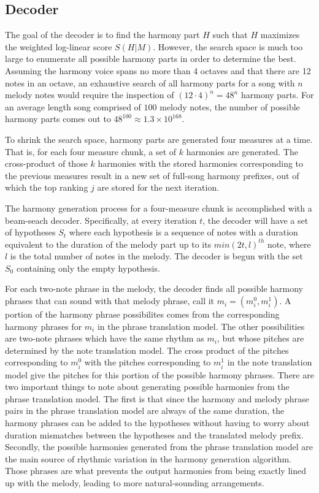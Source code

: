 \documentclass{sig-alternate}
\begin{document}
\subsection {Decoder}
The goal of the decoder is to find the harmony part $H$ such that $H$ maximizes the weighted log-linear score $S(H | M)$. However, the search space is much too large to enumerate all possible harmony parts in order to determine the best. Assuming the harmony voice spans no more than 4 octaves and that there are 12 notes in an octave, an exhaustive search of all harmony parts for a song with $n$ melody notes would require the inspection of $(12\cdot 4)^{n} = 48^{n}$ harmony parts. For an average length song comprised of $100$ melody notes, the number of possible harmony parts comes out to $48^{100} \approx 1.3\times10^{168}$. 

To shrink the search space, harmony parts are generated four measures at a time. That is, for each four measure chunk, a set of $k$ harmonies are generated. The cross-product of those $k$ harmonies with the stored harmonies corresponding to the previous measures result in a new set of full-song harmony prefixes, out of which the top ranking $j$ are stored for the next iteration.

The harmony generation process for a four-measure chunk is accomplished with a beam-seach decoder. Specifically, at every iteration $t$, the decoder will have a set of hypotheses $S_{t}$ where each hypothesis is a sequence of notes with a duration equivalent to the duration of the melody part up to its $min(2t, l)^{th}$ note, where $l$ is the total number of notes in the melody. The decoder is begun with the set $S_{0}$ containing only the empty hypothesis. 

For each two-note phrase in the melody, the decoder finds all possible harmony phrases that can sound with that melody phrase, call it $m_{i} = (m_{i}^{0}, m_{i}^{1})$. A portion of the harmony phrase possibilites comes from the corresponding harmony phrases for $m_{i}$ in the phrase translation model. The other possibilities are two-note phrases which have the same rhythm as $m_{i}$, but whose pitches are determined by the note translation model. The cross product of the pitches corresponding to $m_{i}^{0}$ with the pitches corresponding to $m_{i}^{1}$ in the note translation model give the pitches for this portion of the possible harmony phrases. There are two important things to note about generating possible harmonies from the phrase translation model. The first is that since the harmony and melody phrase pairs in the phrase translation model are always of the same duration, the harmony phrases can be added to the hypotheses without having to worry about duration mismatches between the hypotheses and the translated melody prefix. Secondly, the possible harmonies generated from the phrase translation model are the main source of rhythmic variation in the harmony generation algorithm. Those phrases are what prevents the output harmonies from being exactly lined up with the melody, leading to more natural-sounding arrangements.
\end{document}
